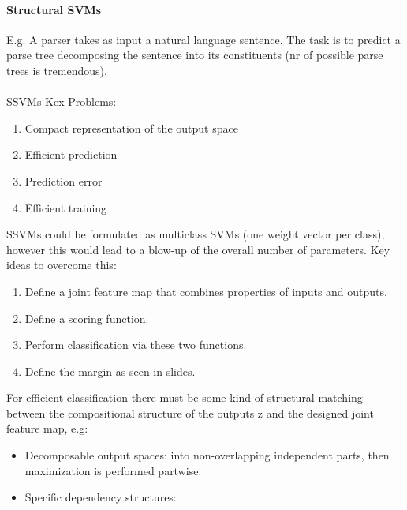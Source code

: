 \paragraph{Structural SVMs}
E.g. A parser takes as input a natural language sentence. The task is to predict a parse tree decomposing the sentence into its constituents (nr of possible parse trees is tremendous).\\
\\
SSVMs Kex Problems:
\begin{enumerate}
    \item Compact representation of the output space
    \item Efficient prediction
    \item Prediction error
    \item Efficient training
\end{enumerate}{}

SSVMs could be formulated as multiclass SVMs (one weight vector per class),
however this would lead to a blow-up of the overall number of parameters. Key ideas to overcome this:
\begin{enumerate}
    \item Define a joint feature map that combines properties of inputs and outputs.
    \item Define a scoring function.
    \item Perform classification via these two functions.
    \item Define the margin as seen in slides.
\end{enumerate}{}

For efficient classification there must be some kind of structural matching between the compositional structure of the outputs z and the designed joint feature map, e.g:
\begin{itemize}
    \item Decomposable output spaces: into non-overlapping independent parts, then maximization is performed partwise.
    \item Specific dependency structures: 
\end{itemize}{}

